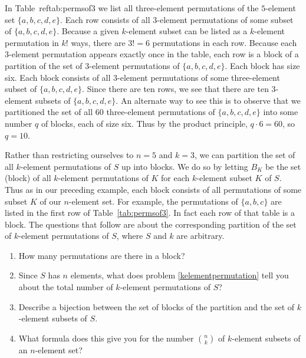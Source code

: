 In Table~ref{tab:permsof3} we list all three-element permutations of
the $5$-element set $\{a,b,c,d,e\}$. Each row consists of all
$3$-element permutations of some subset of $\{a,b,c,d,e\}$. Because a
given $k$-element subset can be listed as a $k$-element permutation in
$k!$ ways, there are $3!=6$ permutations in each row. Because each
$3$-element permutation appears exactly once in the table, each row is
a block of a partition of the set of $3$-element permutations of
$\{a,b,c,d,e\}$. Each block has size six. Each block consists of all
$3$-element permutations of some three-element subset of
$\{a,b,c,d,e\}$. Since there are ten rows, we see that there are ten
$3$-element subsets of $\{a,b,c,d,e\}$. An alternate way to see this
is to observe that we partitioned the set of all $60$ three-element
permutations of $\{a,b,c,d,e\}$ into some number $q$ of blocks, each
of size six. Thus by the product principle, $q\cdot 6=60$, so $q=10$.

\bp

\iteme Rather than restricting ourselves to $n=5$ and $k=3$, we can
partition the set of all $k$-element permutations of $S$ up into
blocks. We do so by letting $B_K$ be the set (block) of all $k$-element
permutations of $K$ for each $k$-element subset $K$ of $S$. Thus as in
our preceding example, each block consists of all permutations of some
subset $K$ of our $n$-element set. For example, the permutations of
$\{a,b,c\}$ are listed in the first row of
Table~\ref{tab:permsof3}. In fact each row of that table is a
block. The questions that follow are about the corresponding partition
of the set of $k$-element permutations of $S$, where $S$ and $k$ are
arbitrary. \label{formulanchoosek}
\begin{enumerate}
\item How many permutations are there in a block?
\item Since $S$ has $n$
  elements, what does problem \ref{kelementpermutation} tell you about
  the total number of $k$-element permutations of $S$?  
\item Describe a
  bijection between the set of blocks of the partition and the set of
  $k$-element subsets of $S$.  
\item What formula does this give you for the
  number $n\choose k$ of $k$-element subsets of an $n$-element set?\label{formulanchoosekfinal}
\end{enumerate}


